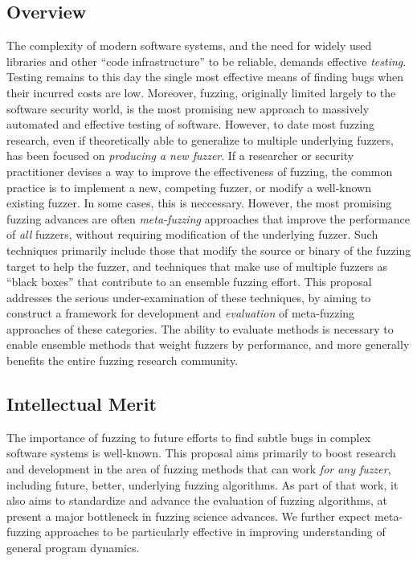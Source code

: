 \centerline{}


\cut{
}

\subsection*{Overview}
\vspace{-2mm}
The complexity of modern software systems, and the need for widely used 
libraries and other ``code infrastructure'' to be reliable, demands effective 
\emph{testing}.  Testing remains to this day the single most effective means of finding 
bugs when their incurred costs are low.   Moreover, fuzzing, originally limited largely to 
the software security world, is the most promising new approach to massively 
automated and effective testing of software.   However, to date most fuzzing 
research, even if theoretically able to generalize to multiple underlying 
fuzzers, has been focused on \emph{producing a new fuzzer}.  If a 
researcher or security practitioner devises a way to improve 
the effectiveness of fuzzing, the common practice is to implement a new, 
competing fuzzer, or modify a well-known existing fuzzer.  In some cases, this 
is neccessary.  However, the most 
promising fuzzing advances are often \emph{meta-fuzzing} approaches that 
improve the performance of \emph{all} fuzzers, without requiring 
modification of the underlying fuzzer.  Such techniques primarily 
include those that modify the source or binary of the fuzzing target to help 
the fuzzer, and techniques that make use of multiple fuzzers as ``black boxes'' 
that contribute to an ensemble fuzzing effort.  This proposal addresses the 
serious under-examination of these techniques, by aiming to construct a 
framework for development and \emph{evaluation} of meta-fuzzing approaches of
these categories.   The ability to evaluate methods is 
necessary to enable ensemble methods that weight fuzzers by
performance, and more generally benefits the entire fuzzing research community.

\subsection*{Intellectual Merit} 
\vspace{-2mm}
The importance of fuzzing to future efforts to find subtle bugs in complex 
software systems is well-known.  This proposal aims primarily to boost research 
and development in the area of fuzzing methods that can work \emph{for any 
fuzzer}, including future, better, underlying fuzzing algorithms.  As part of 
that work, it also aims to standardize and advance the evaluation of fuzzing 
algorithms, at present a major bottleneck in fuzzing science advances.  We 
further expect meta-fuzzing approaches to be particularly effective in improving 
understanding of general program dynamics.

